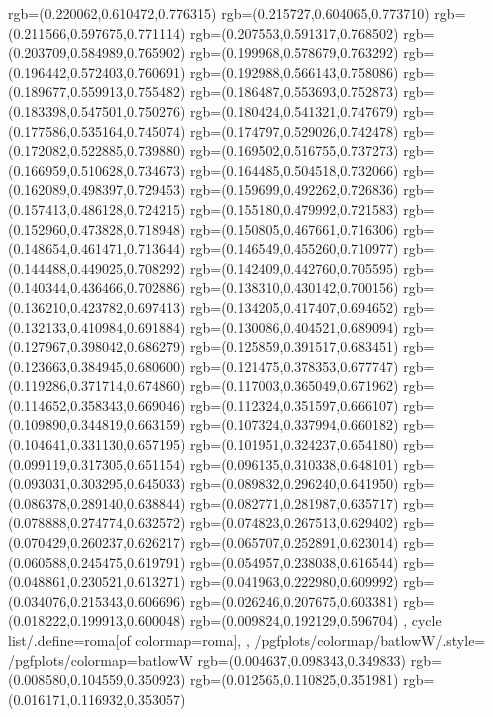 {{{			rgb=(0.220062,0.610472,0.776315)
			rgb=(0.215727,0.604065,0.773710)
			rgb=(0.211566,0.597675,0.771114)
			rgb=(0.207553,0.591317,0.768502)
			rgb=(0.203709,0.584989,0.765902)
			rgb=(0.199968,0.578679,0.763292)
			rgb=(0.196442,0.572403,0.760691)
			rgb=(0.192988,0.566143,0.758086)
			rgb=(0.189677,0.559913,0.755482)
			rgb=(0.186487,0.553693,0.752873)
			rgb=(0.183398,0.547501,0.750276)
			rgb=(0.180424,0.541321,0.747679)
			rgb=(0.177586,0.535164,0.745074)
			rgb=(0.174797,0.529026,0.742478)
			rgb=(0.172082,0.522885,0.739880)
			rgb=(0.169502,0.516755,0.737273)
			rgb=(0.166959,0.510628,0.734673)
			rgb=(0.164485,0.504518,0.732066)
			rgb=(0.162089,0.498397,0.729453)
			rgb=(0.159699,0.492262,0.726836)
			rgb=(0.157413,0.486128,0.724215)
			rgb=(0.155180,0.479992,0.721583)
			rgb=(0.152960,0.473828,0.718948)
			rgb=(0.150805,0.467661,0.716306)
			rgb=(0.148654,0.461471,0.713644)
			rgb=(0.146549,0.455260,0.710977)
			rgb=(0.144488,0.449025,0.708292)
			rgb=(0.142409,0.442760,0.705595)
			rgb=(0.140344,0.436466,0.702886)
			rgb=(0.138310,0.430142,0.700156)
			rgb=(0.136210,0.423782,0.697413)
			rgb=(0.134205,0.417407,0.694652)
			rgb=(0.132133,0.410984,0.691884)
			rgb=(0.130086,0.404521,0.689094)
			rgb=(0.127967,0.398042,0.686279)
			rgb=(0.125859,0.391517,0.683451)
			rgb=(0.123663,0.384945,0.680600)
			rgb=(0.121475,0.378353,0.677747)
			rgb=(0.119286,0.371714,0.674860)
			rgb=(0.117003,0.365049,0.671962)
			rgb=(0.114652,0.358343,0.669046)
			rgb=(0.112324,0.351597,0.666107)
			rgb=(0.109890,0.344819,0.663159)
			rgb=(0.107324,0.337994,0.660182)
			rgb=(0.104641,0.331130,0.657195)
			rgb=(0.101951,0.324237,0.654180)
			rgb=(0.099119,0.317305,0.651154)
			rgb=(0.096135,0.310338,0.648101)
			rgb=(0.093031,0.303295,0.645033)
			rgb=(0.089832,0.296240,0.641950)
			rgb=(0.086378,0.289140,0.638844)
			rgb=(0.082771,0.281987,0.635717)
			rgb=(0.078888,0.274774,0.632572)
			rgb=(0.074823,0.267513,0.629402)
			rgb=(0.070429,0.260237,0.626217)
			rgb=(0.065707,0.252891,0.623014)
			rgb=(0.060588,0.245475,0.619791)
			rgb=(0.054957,0.238038,0.616544)
			rgb=(0.048861,0.230521,0.613271)
			rgb=(0.041963,0.222980,0.609992)
			rgb=(0.034076,0.215343,0.606696)
			rgb=(0.026246,0.207675,0.603381)
			rgb=(0.018222,0.199913,0.600048)
			rgb=(0.009824,0.192129,0.596704)
		},
	cycle list/.define={roma}{[of colormap=roma]},
	},
	/pgfplots/colormap/batlowW/.style={
		/pgfplots/colormap={batlowW}{%
			rgb=(0.004637,0.098343,0.349833)
			rgb=(0.008580,0.104559,0.350923)
			rgb=(0.012565,0.110825,0.351981)
			rgb=(0.016171,0.116932,0.353057)
}}}
